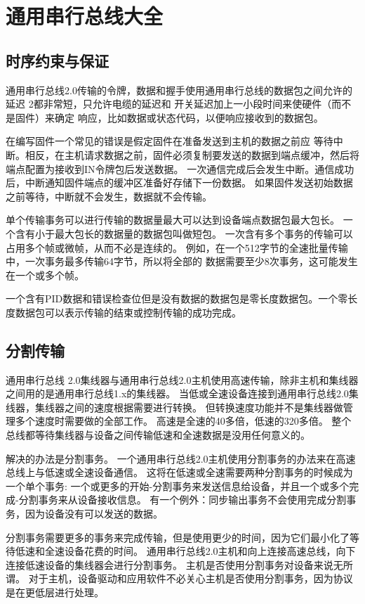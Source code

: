 
\chapter{通用串行总线大全}

\section{时序约束与保证}
通用串行总线2.0传输的令牌，数据和握手使用通用串行总线的数据包之间允许的延迟
2都非常短，只允许电缆的延迟和
开关延迟加上一小段时间来使硬件（而不是固件）来确定
响应，比如数据或状态代码，以便响应接收到的数据包。

在编写固件一个常见的错误是假定固件在准备发送到主机的数据之前应
等待中断。相反，在主机请求数据之前，固件必须复制要发送的数据到端点缓冲，然后将端点配置为接收到IN令牌包后发送数据。
一次通信完成后会发生中断。通信成功后，中断​​通知固件端点的缓冲区准备好存储下一份数据。
如果固件发送初始数据之前等待，中断就不会发生，数据就不会传输。

单个传输事务可以进行传输的数据量最大可以达到设备端点数据包最大包长。
一个含有小于最大包长的数据量的数据包叫做短包。
一次含有多个事务的传输可以占用多个帧或微帧，从而不必是连续的。
例如，在一个512字节的全速批量传输中，一次事务最多传输64字节，所以将全部的
数据需要至少8次事务，这可能发生在一个或多个帧。

一个含有PID数据和错误检查位但是没有数据的数据包是零长度数据包。一个零长度数据包可以表示传输的结束或控制传输的成功完成。
\section{分割传输}

通用串行总线 2.0集线器与通用串行总线2.0主机使用高速传输，除非​​主机和集线器之间用的是通用串行总线1.x的集线器。
当低或全速设备连接到通用串行总线2.0集线器，集线器之间的速度根据需要进行转换。
但转换速度功能并不是集线器做管理多个速度时需要做的全部工作。
高速是全速的40多倍，低速的320多倍。
整个总线都等待集线器与设备之间传输低速和全速数据是没用任何意义的。

解决的办法是分割事务。
一个通用串行总线2.0主机使用分割事务的办法来在高速总线上与低速或全速设备通信。
这将在低速或全速需要两种分割事务的时候成为一个单个事务:
一个或更多的开始-分割事务来发送信息给设备，并且一个或多个完成-分割事务来从设备接收信息。
有一个例外：同步输出事务不会使用完成分割事务，因为设备没有可以发送的数据。

分割事务需要更多的事务来完成传输，但是使用更少的时间，因为它们最小化了等待低速和全速设备花费的时间。
通用串行总线2.0主机和向上连接高速总线，向下连接低速设备的集线器会进行分割事务。
主机是否使用分割事务对设备来说无所谓。
对于主机，设备驱动和应用软件不必关心主机是否使用分割事务，因为协议是在更低层进行处理。